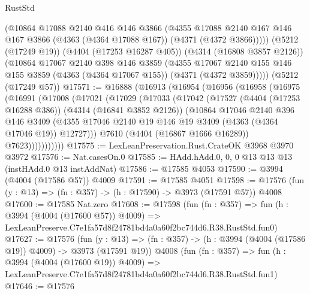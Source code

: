 \begin{lexlean}{RustStd}
\begin{coremodule}
        (@10864
          @17088
          @2140
          @416
          @146
          @3866
          (@4355
            @17088
            @2140
            @167
            @146
            @167
            @3866
            (@4363 (@4364 @17088 @167))
            (@4371 (@4372 @3866)))))
      (@5212 (@17249 @19))
      (@4404 (@17253 @16287 @405))
      (@4314 (@16808 @3857 @2126))
      (@10864
        @17067
        @2140
        @398
        @146
        @3859
        (@4355
          @17067
          @2140
          @155
          @146
          @155
          @3859
          (@4363 (@4364 @17067 @155))
          (@4371 (@4372 @3859)))))
    (@5212 (@17249 @57))
@17571 := @16888
    (@16913
      (@16954
        (@16956
          (@16958
            (@16975
              (@16991
                (@17008
                  (@17021
                    (@17029
                      (@17033
                        (@17042
                          (@17527
                            (@4404 (@17253 @16288 @386))
                            (@4314 (@16841 @3852 @2126))
                            (@10864
                              @17046
                              @2140
                              @396
                              @146
                              @3409
                              (@4355
                                @17046
                                @2140
                                @19
                                @146
                                @19
                                @3409
                                (@4363 (@4364 @17046 @19))
                                @12727)))
                          @7610
                          (@4404 (@16867 @1666 @16289))
                          @7623)))))))))))
@17575 := LexLeanPreservation.Rust.CrateOK @3968 @3970 @3972
@17576 := Nat.casesOn.{0}
@17585 := HAdd.hAdd.{0, 0, 0} @13 @13 @13 (instHAdd.{0} @13 instAddNat)
@17586 := @17585 @4053
@17590 := @3994 (@4004 (@17586 @57)) @4009
@17591 := @17585 @4051
@17598 := @17576 (fun (y : @13) => (fn : @357) -> (h : @17590) -> @3973 (@17591 @57)) @4008
@17600 := @17585 Nat.zero
@17608 := @17598
    (fun (fn : @357) =>
    fun (h : @3994 (@4004 (@17600 @57)) @4009) =>
    LexLeanPreserve.C7e1fa57d8f24781bd4a0a60f2bc744d6.R38.RustStd.fun0)
@17627 := @17576
    (fun (y : @13) => (fn : @357) -> (h : @3994 (@4004 (@17586 @19)) @4009) -> @3973 (@17591 @19))
    @4008
    (fun (fn : @357) =>
    fun (h : @3994 (@4004 (@17600 @19)) @4009) =>
    LexLeanPreserve.C7e1fa57d8f24781bd4a0a60f2bc744d6.R38.RustStd.fun1)
@17646 := @17576

\end{coremodule}
\end{lexlean}
